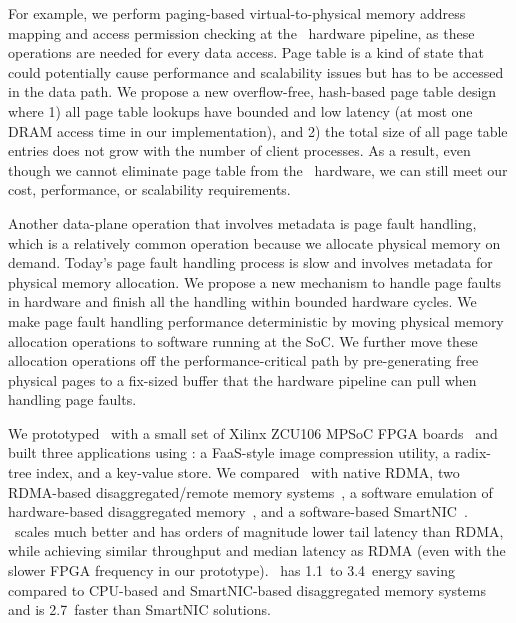 For example, we perform paging-based virtual-to-physical memory address mapping and access permission checking at the \MN\ hardware pipeline, as these operations are needed for every data access.
Page table is a kind of state that could potentially cause performance and scalability issues but has to be accessed in the data path.
We propose a new overflow-free, hash-based page table design where 1) all page table lookups have bounded and low latency (at most one DRAM access time in our implementation), and 2) the total size of all page table entries does not grow with the number of client processes.
As a result, even though we cannot eliminate page table from the \MN\ hardware, we can still meet our cost, performance, or scalability requirements.

Another data-plane operation that involves metadata is page fault handling, which is a relatively common operation because we allocate physical memory on demand.
Today's page fault handling process is slow and involves metadata for physical memory allocation.
We propose a new mechanism to handle page faults in hardware and finish all the handling within bounded hardware cycles.
We make page fault handling performance deterministic by moving  physical memory allocation operations to software running at the SoC.
We further move these allocation operations off the performance-critical path by pre-generating free physical pages to a fix-sized buffer that the hardware pipeline can pull when handling page faults.

We prototyped \sysboard\ with a small set of Xilinx ZCU106 MPSoC FPGA boards~\cite{ZCU106} and built three applications using \sys:
a FaaS-style image compression utility, a radix-tree index, and a key-value store.
We compared \sys\ with native RDMA, two RDMA-based disaggregated/remote memory systems~\cite{Tsai20-ATC,Kalia14-RDMAKV}, 
a software emulation of hardware-based disaggregated memory~\cite{Shan18-OSDI},
and a software-based SmartNIC~\cite{BlueField}.
\sys\ scales much better and has orders of magnitude lower tail latency than RDMA, 
while achieving similar throughput and median latency as RDMA (even with the slower FPGA frequency in our prototype).
\sys\ has 1.1\x\ to 3.4\x\ energy saving compared to CPU-based and SmartNIC-based disaggregated memory systems 
and is 2.7\x\ faster than SmartNIC solutions. 


